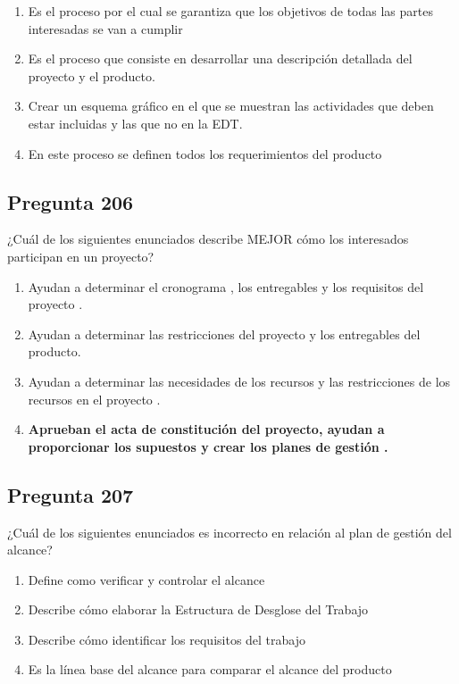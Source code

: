 \documentclass[11pt,a4paper]{article}
\begin{document}
\begin{enumerate}[label=\alph*)]
  \item Es el proceso por el cual se garantiza que los objetivos de todas las partes interesadas se van a cumplir
  \item Es el proceso que consiste en desarrollar una descripción detallada del proyecto y el producto.
  \item Crear un esquema gráfico en el que se muestran las actividades que deben estar incluidas y las que no en la EDT.
  \item En este proceso se definen todos los requerimientos del producto
\end{enumerate}

\subsection*{Pregunta 206}
¿Cuál de los siguientes enunciados describe MEJOR cómo los interesados participan en un proyecto?

\begin{enumerate}[label=\alph*)]
  \item Ayudan a determinar el cronograma , los entregables y los requisitos del proyecto .
  \item Ayudan a determinar las restricciones del proyecto y los entregables del producto.
  \item Ayudan a determinar las necesidades de los recursos y las restricciones de los recursos en el proyecto .
  \item \textbf{Aprueban el acta de constitución del proyecto, ayudan a proporcionar los supuestos y crear los planes de gestión .}
\end{enumerate}

\subsection*{Pregunta 207}
¿Cuál de los siguientes enunciados es incorrecto en relación al plan de gestión del alcance?

\begin{enumerate}[label=\alph*)]
  \item Define como verificar y controlar el alcance
  \item Describe cómo elaborar la Estructura de Desglose del Trabajo
  \item Describe cómo identificar los requisitos del trabajo
  \item Es la línea base del alcance para comparar el alcance del producto
\end{enumerate}
\end{document}
